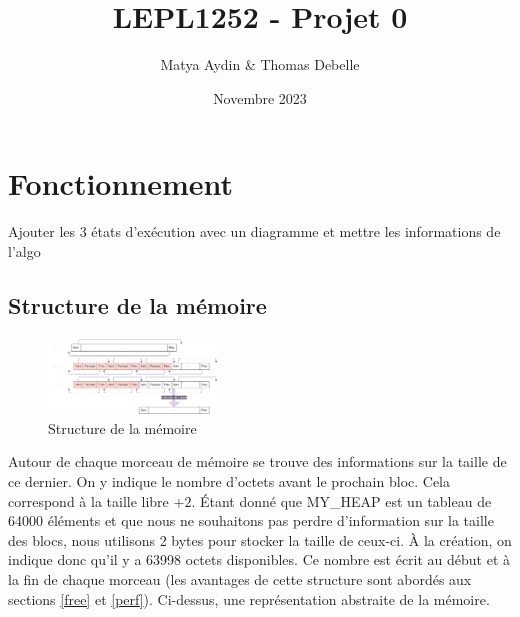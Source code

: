 \documentclass{article}
\title{LEPL1252 - Projet 0}
\author{Matya Aydin \& Thomas Debelle}
\date{Novembre 2023}
\begin{document}
\maketitle

\section{Fonctionnement}


Ajouter les 3 états d'exécution avec un diagramme et mettre les informations de l'algo

\subsection{Structure de la mémoire}

\begin{figure}
    \centering
    \includegraphics[width=0.4\textwidth, clip]{fonctionnement.png}
    \caption{Structure de la mémoire}
    \label{fct}

\end{figure}

Autour de chaque morceau de mémoire se trouve des informations sur la taille de ce dernier. On y indique le nombre d'octets avant le prochain bloc. Cela correspond à la taille libre $+ 2$.
Étant donné que MY\_HEAP est un tableau de 64000 éléments et que nous ne souhaitons pas perdre d'information sur la taille des blocs, nous utilisons 2 bytes pour stocker la taille de ceux-ci.
À la création, on indique donc qu'il y a 63998 octets disponibles. Ce nombre est écrit au début et à la fin de chaque morceau (les avantages de cette structure sont abordés aux sections \ref{free} et \ref{perf}). Ci-dessus, une représentation abstraite de la mémoire.
\end{document}
